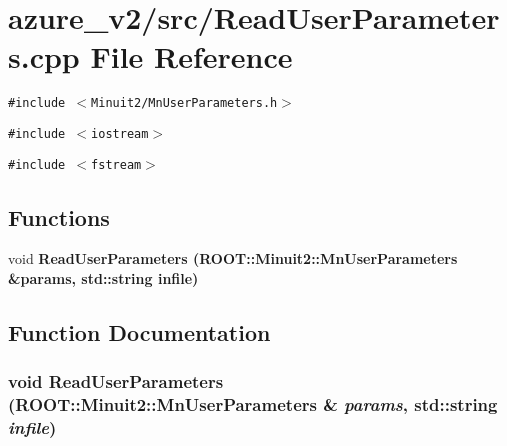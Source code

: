 \section{azure\_\-v2/src/Read\-User\-Parameters.cpp File Reference}
\label{ReadUserParameters_8cpp}
{\tt \#include $<$Minuit2/Mn\-User\-Parameters.h$>$}\par
{\tt \#include $<$iostream$>$}\par
{\tt \#include $<$fstream$>$}\par
\subsection*{Functions}
\begin{CompactItemize}
\item 
void \bf{Read\-User\-Parameters} (ROOT::Minuit2::Mn\-User\-Parameters \&params, std::string infile)
\end{CompactItemize}


\subsection{Function Documentation}
\subsubsection{\setlength{\rightskip}{0pt plus 5cm}void Read\-User\-Parameters (ROOT::Minuit2::Mn\-User\-Parameters \& {\em params}, std::string {\em infile})}\label{ReadUserParameters_8cpp_779848b5276fa74d71c635f15feb25bd}



